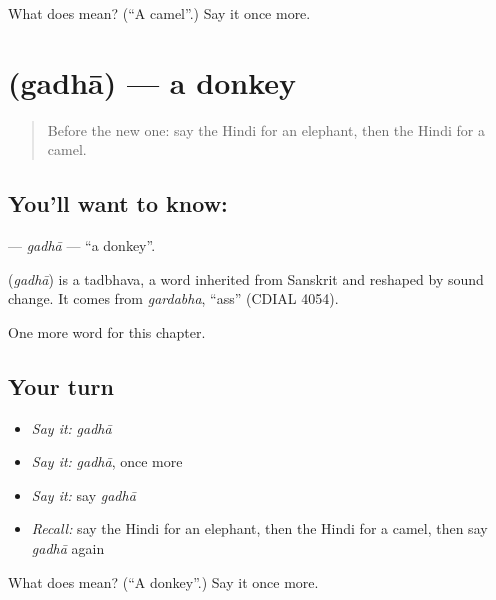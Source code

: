 \begin{tcolorbox}[breakable,colback=teal!4,colframe=teal!35!black,title={Before you move on}]
What does  mean? (\textquotedblleft{}A camel\textquotedblright{}.) Say it once more.
\end{tcolorbox}
\section[\texorpdfstring{\hi{गधा} (gadhā)}{गधा (gadhā)}]{ (gadhā) — a donkey}

\label{lesson:HI-C146-gadha}



\begin{quote}
Before the new one: say the Hindi for an elephant, then the Hindi for a camel.
\end{quote}

\subsection*{You'll want to know: }
\textbf{} — \emph{gadhā} — \textquotedblleft{}a donkey\textquotedblright{}.

\begin{cousinweb}
\textbf{} (\emph{gadhā}) is a tadbhava, a word inherited from Sanskrit and reshaped by sound change. It comes from \emph{gardabha}, \textquotedblleft{}ass\textquotedblright{} (CDIAL 4054).
\end{cousinweb}

\begin{grammarlens}[title={What you've built}]
One more word for this chapter.
\end{grammarlens}

\subsection*{Your turn}
\begin{itemize}
\raggedright
  \item \emph{Say it:} \emph{gadhā}
  \item \emph{Say it:} \emph{gadhā}, once more
  \item \emph{Say it:} say \emph{gadhā}
  \item \emph{Recall:} say the Hindi for an elephant, then the Hindi for a camel, then say \emph{gadhā} again
\end{itemize}

\begin{tcolorbox}[breakable,colback=teal!4,colframe=teal!35!black,title={Before you move on}]
What does  mean? (\textquotedblleft{}A donkey\textquotedblright{}.) Say it once more.
\end{tcolorbox}
